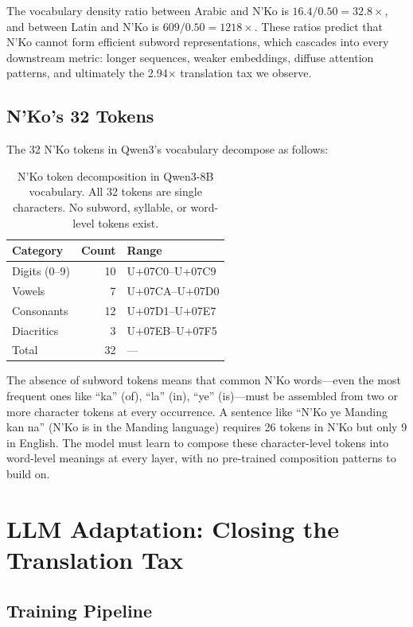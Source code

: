 \documentclass[11pt]{article}
\begin{document}
The vocabulary density ratio between Arabic and N'Ko is $16.4 / 0.50 = 32.8\times$, and between Latin and N'Ko is $609 / 0.50 = 1218\times$.
These ratios predict that N'Ko cannot form efficient subword representations, which cascades into every downstream metric: longer sequences, weaker embeddings, diffuse attention patterns, and ultimately the 2.94$\times$ translation tax we observe.

\subsection{N'Ko's 32 Tokens}

The 32 N'Ko tokens in Qwen3's vocabulary decompose as follows:

\begin{table}[t]
\centering
\small
\begin{tabular}{lrl}
\toprule
\textbf{Category} & \textbf{Count} & \textbf{Range} \\
\midrule
Digits (0--9) & 10 & U+07C0--U+07C9 \\
Vowels & 7 & U+07CA--U+07D0 \\
Consonants & 12 & U+07D1--U+07E7 \\
Diacritics & 3 & U+07EB--U+07F5 \\
\midrule
Total & 32 & --- \\
\bottomrule
\end{tabular}
\caption{N'Ko token decomposition in Qwen3-8B vocabulary. All 32 tokens are single characters. No subword, syllable, or word-level tokens exist.}
\label{tab:nko-tokens}
\end{table}

The absence of subword tokens means that common N'Ko words---even the most frequent ones like ``ka'' (of), ``la'' (in), ``ye'' (is)---must be assembled from two or more character tokens at every occurrence.
A sentence like ``N'Ko ye Manding kan na'' (N'Ko is in the Manding language) requires 26 tokens in N'Ko but only 9 in English.
The model must learn to compose these character-level tokens into word-level meanings at every layer, with no pre-trained composition patterns to build on.

\section{LLM Adaptation: Closing the Translation Tax}
\label{sec:adaptation}

\subsection{Training Pipeline}
\end{document}

